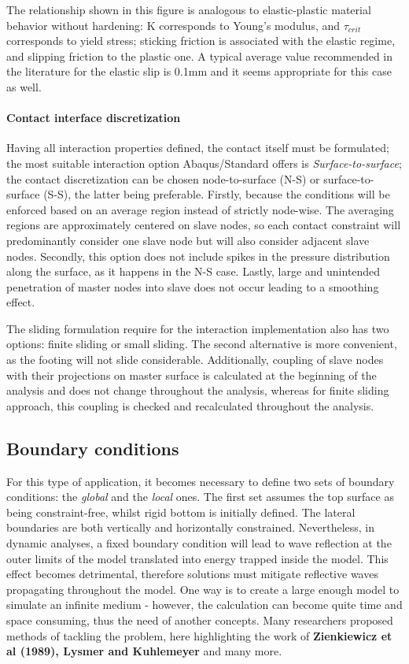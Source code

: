 The relationship shown in this figure is analogous to elastic-plastic material behavior without hardening: K corresponds to Young's modulus, and $\tau_{crit}$ corresponds to yield stress; sticking friction is associated with the elastic regime, and slipping friction to the plastic one. A typical average value recommended in the literature for the elastic slip is 0.1mm and it seems appropriate for this case as well.

\paragraph{Contact interface discretization}
Having all interaction properties defined, the contact itself must be formulated; the most suitable interaction option Abaqus/Standard offers is \textit{Surface-to-surface}; the contact discretization can be chosen node-to-surface (N-S) or surface-to-surface (S-S), the latter being preferable. Firstly, because the conditions will be enforced based on an average region instead of strictly node-wise. The averaging regions are approximately centered on slave nodes, so each contact constraint will predominantly consider one slave node but will also consider adjacent slave nodes. Secondly, this option does not include spikes in the pressure distribution along the surface, as it happens in the N-S case. Lastly, large and unintended penetration of master nodes into slave does not occur leading to a smoothing effect.

The sliding formulation require for the interaction implementation also has two options: finite sliding or small sliding. The second alternative is more convenient, as the footing will not slide considerable. Additionally, coupling of slave nodes with their projections on master surface
is calculated at the beginning of the analysis and does not change throughout the analysis,
whereas for finite sliding approach, this coupling is checked and recalculated throughout the
analysis.

\subsection{Boundary conditions}
For this type of application, it becomes necessary to define two sets of boundary conditions: the \textit{global} and the \textit{local} ones. The first set assumes the top surface as being constraint-free, whilst rigid bottom is initially defined. The lateral boundaries are both vertically and horizontally constrained.
Nevertheless, in dynamic analyses, a fixed boundary condition will lead to wave reflection at the outer limits of the model translated into energy trapped inside the model. This effect becomes detrimental, therefore solutions must mitigate reflective waves propagating throughout the model. One way is to create a large enough model to simulate an infinite medium - however, the calculation can become quite time and space consuming, thus the need of another concepts. Many researchers proposed methods of tackling the problem, here highlighting the work of  \textbf{Zienkiewicz et al (1989), Lysmer and Kuhlemeyer} and many more.

